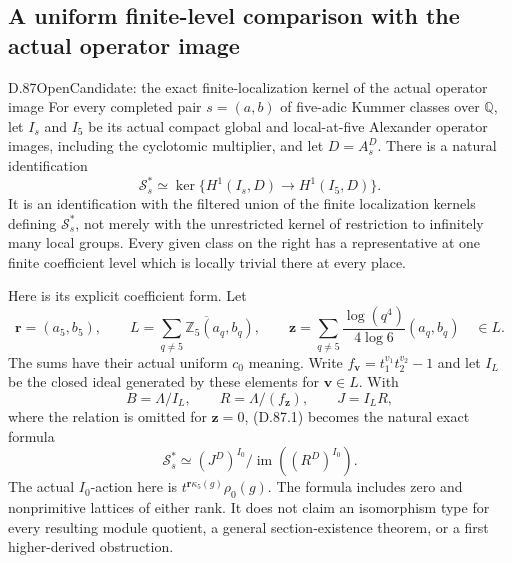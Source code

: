 \subsection{A uniform finite-level comparison with the actual operator image}

\begin{statement}{D.87}{Open}{Candidate: the exact finite-localization kernel of the actual operator image}
For every completed pair \(s=(a,b)\) of five-adic Kummer classes
over \(\mathbb Q\), let \(I_s\) and \(I_5\) be its actual
compact global and local-at-five Alexander operator images,
including the cyclotomic multiplier, and let \(D=A_s^D\).
There is a natural identification
\[
 \mathcal S_s^*\simeq
 \ker\{H^1(I_s,D)\longrightarrow H^1(I_5,D)\}.       \tag{D.87.1}
\]
It is an identification with the filtered union of the finite
localization kernels defining \(\mathcal S_s^*\), not merely
with the unrestricted kernel of restriction to infinitely many
local groups. Every given class on the right has a representative
at one finite coefficient level which is locally trivial there
at every place.

Here is its explicit coefficient form. Let
\[
 \mathbf r=(a_5,b_5),\qquad
 L=\overline{\sum_{q\ne5}\mathbb Z_5(a_q,b_q)},\qquad
 \mathbf z=\sum_{q\ne5}\frac{\log(q^4)}{4\log6}(a_q,b_q)
                                                     \quad\in L.
                                                               \tag{D.87.2}
\]
The sums have their actual uniform \(c_0\) meaning. Write
\(f_{\mathbf v}=t_1^{v_1}t_2^{v_2}-1\) and let \(I_L\)
be the closed ideal generated by these elements for
\(\mathbf v\in L\). With
\[
 B=\Lambda/I_L,\qquad R=\Lambda/(f_{\mathbf z}),
                 \qquad J=I_LR,
                                                               \tag{D.87.3}
\]
where the relation is omitted for \(\mathbf z=0\), (D.87.1)
becomes the natural exact formula
\[
 \mathcal S_s^*\simeq
       (J^D)^{I_0}/\operatorname{im}((R^D)^{I_0}).       \tag{D.87.4}
\]
The actual \(I_0\)-action here is
\(t^{\mathbf r\kappa_5(g)}\rho_0(g)\). The formula
includes zero and nonprimitive lattices of either rank.
It does not claim an isomorphism type for every resulting
module quotient, a general section-existence theorem, or a
first higher-derived obstruction.

\end{statement}

